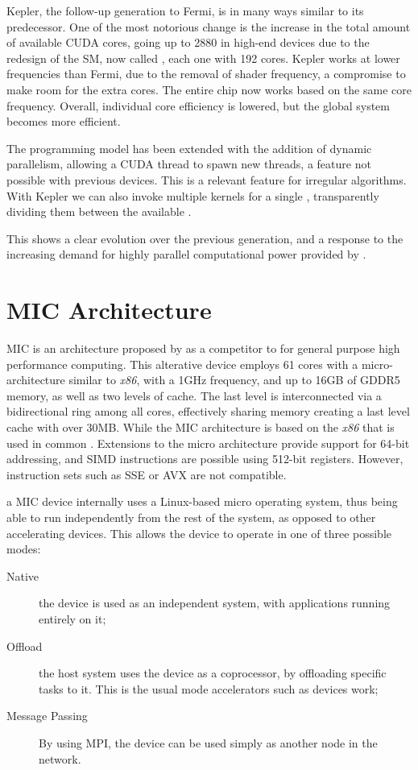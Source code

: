 \documentclass[main.tex]{subfiles}
\begin{document}
Kepler, the follow-up generation to Fermi, is in many ways similar to its predecessor. One of the most notorious change is the increase in the total amount of available CUDA cores, going up to 2880 in high-end devices due to the redesign of the \acl{SM}, now called \smx, each one with 192 \cuda cores. Kepler works at lower frequencies than Fermi, due to the removal of shader frequency, a compromise to make room for the extra \cuda cores. The entire chip now works based on the same core frequency. Overall, individual core efficiency is lowered, but the global system becomes more efficient.


The programming model has been extended with the addition of dynamic parallelism, allowing a \acs{CUDA} thread to spawn new threads, a feature not possible with previous \nvidia devices. This is a relevant feature for irregular algorithms. With Kepler we can also invoke multiple kernels for a single \gpu, transparently dividing them between the available \smxs.

This shows a clear evolution over the previous generation, and a response to the increasing demand for highly parallel computational power provided by \gpus.


\section{MIC Architecture}

\acf{MIC} \cite{Intel:MIC:QuickStartGuide} is an architecture proposed by \intel as a competitor to \gpus for general purpose high performance computing. This alterative device employs 61 cores with a micro-architecture similar to \textit{x86}, with a 1GHz frequency, and up to 16GB of GDDR5 memory, as well as two levels of cache. The last level is interconnected via a bidirectional ring among all cores, effectively sharing memory creating a last level cache with over 30MB.
While the \acs{MIC} architecture is based on the \textit{x86} that is used in common \cpus. Extensions to the micro architecture provide support for 64-bit addressing, and SIMD instructions are possible using 512-bit registers. However, instruction sets such as \acf{SSE} or \acf{AVX} are not compatible.

a \acs{MIC} device internally uses a Linux-based micro operating system, thus being able to run independently from the rest of the system, as opposed to other accelerating devices. This allows the device to operate in one of three possible modes:
\begin{description}
\item[Native] the device is used as an independent system, with applications running entirely on it;
\item[Offload] the host system uses the device as a coprocessor, by offloading specific tasks to it. This is the usual mode accelerators such as \cuda devices work;
\item[Message Passing] By using \acs{MPI}, the device can be used simply as another node in the network.
\end{description}
\end{document}
